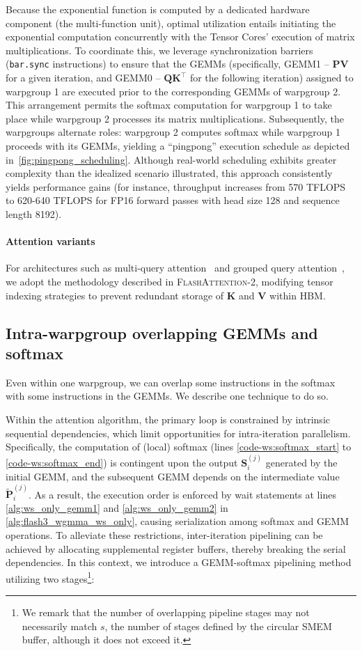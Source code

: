Because the exponential function is computed by a dedicated hardware component (the multi-function unit), optimal utilization entails initiating the exponential computation concurrently with the Tensor Cores' execution of matrix multiplications. To coordinate this, we leverage synchronization barriers (\texttt{bar.sync} instructions) to ensure that the GEMMs (specifically, GEMM1 -- $\mathbf{P} \mathbf{V}$ for a given iteration, and GEMM0 -- $\mathbf{Q} \mathbf{K}^\top$ for the following iteration) assigned to warpgroup 1 are executed prior to the corresponding GEMMs of warpgroup 2. This arrangement permits the softmax computation for warpgroup 1 to take place while warpgroup 2 processes its matrix multiplications. Subsequently, the warpgroups alternate roles: warpgroup 2 computes softmax while warpgroup 1 proceeds with its GEMMs, yielding a ``pingpong'' execution schedule as depicted in~\cref{fig:pingpong_scheduling}. Although real-world scheduling exhibits greater complexity than the idealized scenario illustrated, this approach consistently yields performance gains (for instance, throughput increases from 570 TFLOPS to 620-640 TFLOPS for FP16 forward passes with head size 128 and sequence length 8192).

\paragraph{Attention variants} For architectures such as multi-query attention~\citep{shazeer2019fast} and grouped query attention~\citep{ainslie2023gqa}, we adopt the methodology described in \textsc{FlashAttention-2}, modifying tensor indexing strategies to prevent redundant storage of $\mathbf{K}$ and $\mathbf{V}$ within HBM.

\subsection{Intra-warpgroup overlapping GEMMs and softmax}

Even within one warpgroup, we can overlap some instructions in the softmax with some instructions in the GEMMs. We describe one technique to do so.

Within the attention algorithm, the primary loop is constrained by intrinsic sequential dependencies, which limit opportunities for intra-iteration parallelism. Specifically, the computation of (local) softmax (lines \ref{code-ws:softmax_start} to \ref{code-ws:softmax_end}) is contingent upon the output $\mathbf{S}_i^{(j)}$ generated by the initial GEMM, and the subsequent GEMM depends on the intermediate value $\widetilde{\mathbf{P}}_i^{(j)}$. As a result, the execution order is enforced by wait statements at lines \ref{alg:ws_only_gemm1} and \ref{alg:ws_only_gemm2} in \cref{alg:flash3_wgmma_ws_only}, causing serialization among softmax and GEMM operations. To alleviate these restrictions, inter-iteration pipelining can be achieved by allocating supplemental register buffers, thereby breaking the serial dependencies. In this context, we introduce a GEMM-softmax pipelining method utilizing two stages\footnote{We remark that the number of overlapping pipeline stages may not necessarily match $s$, the number of stages defined by the circular SMEM buffer, although it does not exceed it.}:

